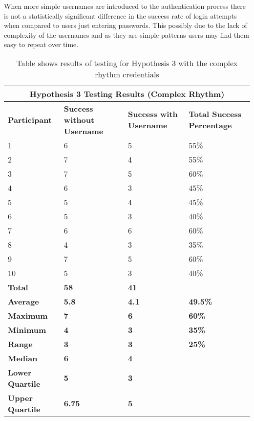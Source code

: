\documentclass{article}
\begin{document}
When more simple usernames are introduced to the authentication process there is not a statistically significant difference in the success rate of login attempts when compared to users just entering passwords. This possibly due to the lack of complexity of the usernames and as they are simple patterns users may find them easy to repeat over time.  

{
\begin{table} [H]
\centering
\begin{tabular}{ |p{2cm}|p{4cm}|p{4cm}| p{4cm} | }
\hline
\multicolumn{4}{|c|}{\textbf{Hypothesis 3 Testing Results (Complex Rhythm)}} \\
\hline
\textbf{Participant} & \textbf{Success without Username} & \textbf{Success with Username} & \textbf{Total Success Percentage} \\
\hline
1 & 6 & 5 & 55\% \\
\hline
2 & 7 & 4 & 55\% \\
\hline
3 & 7 & 5 & 60\% \\
\hline
4 & 6 & 3 & 45\%  \\
\hline
5 & 5 & 4 & 45\% \\
\hline
6 & 5 & 3 & 40\% \\
\hline
7 & 6 & 6 & 60\% \\
\hline
8 & 4 & 3 & 35\% \\
\hline
9 & 7 & 5 & 60\% \\
\hline
10 & 5 & 3 & 40\% \\
\hline
\textbf{Total} & \textbf{58} & \textbf{41} & \\
\hline
\textbf{Average} & \textbf{5.8} & \textbf{4.1} & \textbf{49.5\%} \\
\hline
\textbf{Maximum} & \textbf{7} & \textbf{6} & \textbf{60\%} \\
\hline
\textbf{Minimum} & \textbf{4} & \textbf{3} & \textbf{35\%} \\
\hline
\textbf{Range} & \textbf{3} & \textbf{3} & \textbf{25\%} \\
\hline
\textbf{Median} & \textbf{6} & \textbf{4} & \\
\hline
\textbf{Lower Quartile} & \textbf{5} & \textbf{3} & \\
\hline
\textbf{Upper Quartile} & \textbf{6.75} & \textbf{5} & \\
\hline
\end{tabular}
\caption{Table shows results of testing for Hypothesis 3 with the complex rhythm credentials}
\label{table:4}
\end{table}
}
\end{document}
